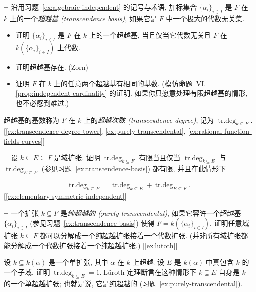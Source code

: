 \begin{prob}\label{ex:transcendence-basis}
$\neg$ 沿用习题~\ref{ex:algebraic-independent} 的记号与术语, 加标集合 $\{\alpha_i\}_{i\in I}$ 是 $F$ 在 $k$ 上的一个\emph{超越基 (transcendence basis)}, 如果它是 $F$ 中一个极大的代数无关集.

\begin{itemize}
\item 证明 $\{\alpha_i\}_{i\in I}$ 是 $F$ 在 $k$ 上的一个超越基, 当且仅当它代数无关且 $F$ 在 $k(\{\alpha_i\}_{i\in I})$ 上代数.
\item 证明超越基存在. (Zorn)
\item 证明 $F$ 在 $k$ 上的任意两个超越基有相同的基数. (模仿命题~VI.\ref{prop:independent-cardinality} 的证明. 如果你只愿意处理有限超越基的情形, 也不必感到难过.)
\end{itemize}
超越基的基数称为 $F$ 在 $k$ 上的\emph{超越次数 (transcendence degree)}, 记为 $\operatorname{tr.deg}_{k\subseteq F}$. [\ref{ex:transcendence-degree-tower}, \ref{ex:purely-transcendental}, \ref{ex:rational-function-fields-curves}]
\end{prob}

\begin{prob}\label{ex:transcendence-degree-tower}
$\neg$ 设 $k\subseteq E\subseteq F$ 是域扩张. 证明 $\operatorname{tr.deg}_{k\subseteq F}$ 有限当且仅当 $\operatorname{tr.deg}_{k\subseteq E}$ 与 $\operatorname{tr.deg}_{E\subseteq F}$ (参见习题~\ref{ex:transcendence-basis}) 都有限, 并且在此情形下

\begin{equation}
\operatorname{tr.deg}_{k\subseteq F}=\operatorname{tr.deg}_{k\subseteq E}+\operatorname{tr.deg}_{E\subseteq F}.\tag{*}
\end{equation} [\ref{ex:elementary-symmetric-independent}]
\end{prob}

\begin{prob}\label{ex:purely-transcendental}
$\neg$ 一个扩张 $k\subseteq F$ 是\emph{纯超越的 (purely transcendental)}, 如果它容许一个超越基 $\{\alpha_i\}_{i\in I}$ (参见习题~\ref{ex:transcendence-basis}) 使得 $F=k(\{\alpha_i\}_{i\in I})$.
证明任意域扩张 $k\subseteq F$ 都可以分解成一个纯超越扩张接着一个代数扩张. (并非所有域扩张都能分解成一个代数扩张接着一个纯超越扩张.) [\ref{ex:lutoth}]
\end{prob}

\begin{prob}\label{ex:lutoth}
设 $k\subseteq k(\alpha)$ 是一个单扩张, 其中 $\alpha$ 在 $k$ 上超越. 设 $E$ 是 $k(\alpha)$ 中真包含 $k$ 的一个子域. 证明 $\operatorname{tr.deg}_{k\subseteq E}=1$.
L\"uroth 定理断言在这种情形下 $k\subseteq E$ 自身是 $k$ 的一个单超越扩张; 也就是说, 它是纯超越的 (习题~\ref{ex:purely-transcendental}).
\end{prob}

